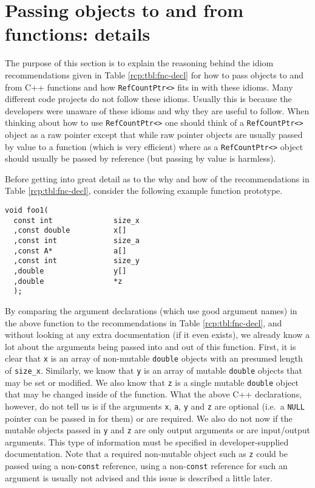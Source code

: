 %
\section{Passing objects to and from functions: details}
\label{rcp:apdx:passing_args}
%

The purpose of this section is to explain the reasoning behind the
idiom recommendations given in Table {}\ref{rcp:tbl:fnc-decl} for how
to pass objects to and from C++ functions and how
{}\texttt{Ref\-Count\-Ptr<>} fits in with these idioms.  Many different
code projects do not follow these idioms.  Usually this is because the
developers were unaware of these idioms and why they are useful to
follow.  When thinking about how to use {}\texttt{Ref\-Count\-Ptr<>} one
should think of a {}\texttt{Ref\-Count\-Ptr<>} object as a raw pointer
except that while raw pointer objects are usually passed by value to a
function (which is very efficient) where as a {}\texttt{Ref\-Count\-Ptr<>}
object should usually be passed by reference (but passing by value is
harmless).

Before getting into great detail as to the why and how of the
recommendations in Table {}\ref{rcp:tbl:fnc-decl}, consider the
following example function prototype.
%
{\scriptsize\begin{verbatim}
void foo1(
  const int              size_x
  ,const double          x[]
  ,const int             size_a
  ,const A*              a[]
  ,const int             size_y
  ,double                y[]
  ,double                *z
  );
\end{verbatim}}
%
By comparing the argument declarations (which use good argument names)
in the above function to the recommendations in Table
{}\ref{rcp:tbl:fnc-decl}, and without looking at any extra
documentation (if it even exists), we already know a lot about the
arguments being passed into and out of this function.  First, it is
clear that {}\texttt{x} is an array of non-mutable {}\texttt{double}
objects with an presumed length of {}\texttt{size\_x}.  Similarly, we
know that {}\texttt{y} is an array of mutable {}\texttt{double}
objects that may be set or modified.  We also know that {}\texttt{z}
is a single mutable {}\texttt{double} object that may be changed
inside of the function.  What the above C++ declarations, however, do
not tell us is if the arguments {}\texttt{x}, {}\texttt{a},
{}\texttt{y} and {}\texttt{z} are optional (i.e.~a {}\texttt{NULL}
pointer can be passed in for them) or are required.  We also do not
now if the mutable objects passed in {}\texttt{y} and {}\texttt{z} are
only output arguments or are input/output arguments.  This type of
information must be specified in developer-supplied documentation.
Note that a required non-mutable object such as {}\texttt{z} could be
passed using a non-{}\texttt{const} reference, using a
non-{}\texttt{const} reference for such an argument is usually not
advised and this issue is described a little later.

